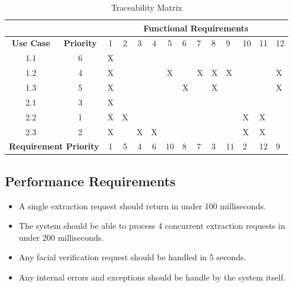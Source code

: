 \documentclass{article}
\begin{document}
		\begin{table}[h]
\centering
\caption{Traceability Matrix}
\label{my-label}
\begin{tabular}{cc|c|c|c|c|c|l|l|l|l|l|l|l|}
\cline{3-14}
                                        &                   & \multicolumn{12}{c|}{\textbf{Functional Requirements}} \\ \hline
\multicolumn{1}{|c|}{\textbf{Use Case}} & \textbf{Priority} & 1 & 2 & 3 & 4 & 5  & 6 & 7 & 8 & 9  & 10 & 11 & 12 	 \\ \hline
\multicolumn{1}{|c|}{1.1}               & 6                 & X &   &   &   &    &   &   &   &    &    &    &    	 \\ \hline
\multicolumn{1}{|c|}{1.2}               & 4                 & X &   &   &   & X  &   & X & X & X  &    &    & X  	 \\ \hline
\multicolumn{1}{|c|}{1.3}               & 5                 & X &   &   &   &    & X &   & X &    &    &    & X  	 \\ \hline
\multicolumn{1}{|c|}{2.1}               & 3                 & X &   &   &   &    &   &   &   &    &    &    &    	 \\ \hline
\multicolumn{1}{|c|}{2.2}               & 1                 & X & X &   &   &    &   &   &   &    & X  & X  &    	 \\ \hline
\multicolumn{1}{|c|}{2.3}               & 2                 & X &   & X & X &    &   &   &   &    & X  & X  &    	 \\ \hline
\multicolumn{2}{|c|}{\textbf{Requirement Priority}}         & 1 & 5 & 4 & 6 & 10 & 8 & 7 & 3 & 11 & 2  & 12 & 9  	 \\ \hline
\end{tabular}
\end{table}
		
		
		
		\subsection{Performance Requirements}\label{subsec:specific-performance}
		\begin{itemize}
		\item A single extraction request should return in under 100 milliseconds.
		\item The system should be able to process 4 concurrent extraction requests in under 200 milliseconds.
		\item Any facial verification request should be handled in 5 seconds.
		    \item Any internal errors and exceptions should be handle by the system itself.
		\end{itemize}
\end{document}
